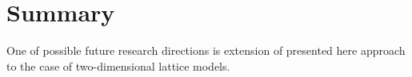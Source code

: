 \chapter{Summary}
\thispagestyle{chapterBeginStyle}

One of possible future research directions is extension of presented
here approach to the case of two-dimensional lattice models.